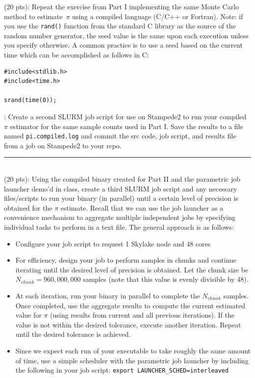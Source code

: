 \documentclass[letterpaper,12pt]{article}
\begin{document}
{ (20 pts): Repeat the exercise from Part I
implementing the same Monte Carlo method to estimate~$\pi$ using a
compiled language (C/C++ or Fortran). Note: if you use the
\texttt{rand()} function from the standard C library as the source of
the random number generator, the seed value is the same upon each
execution unless you specify otherwise. A common practice is to use a
seed based on the current time which can be accomplished as
follows in C:

\begin{verbatim}
#include<stdlib.h>
#include<time.h> 

srand(time(0));
\end{verbatim}

: Create a second SLURM job script for use on
Stampede2 to run your compiled $\pi$ estimator for the same sample
counts used in Part I. Save the results to a file named
\texttt{pi.compiled.log} and commit the src code, job script, and
results file from a job on Stampede2 to your repo. 

\clearpage
\noindent\rule{2cm}{0.4pt} \\

 (20 pts): Using the compiled binary created
for Part II and the parametric job launcher demo'd in class, create a
third SLURM job script and any necessary files/scripts to run your
binary (in parallel) until a certain level of precision is obtained
for the $\pi$ estimate.  Recall that we can use the job launcher as a
convenience mechanism to aggregate multiple independent jobs by
specifying individual tasks to perform in a text file. The general
approach is as follows:

\begin{itemize}

\item Configure your job script to request 1 Skylake node and 48 cores
\item For efficiency, design your job to perform samples in chunks and
  continue iterating until the desired level of precision is
  obtained. Let the chunk size be 
  $N_{chunk} = 960,000,000$ samples (note that this value is evenly divisible by 48).
\item At each iteration, run your binary in parallel to complete the
  $N_{chunk}$ samples. Once completed, use the aggregate results to
  compute the current estimated value for $\pi$ (using results from
  current and all previous iterations). If the value is not within the
  desired tolerance, execute another iteration. Repeat until the
  desired tolerance is achieved.
\item Since we expect each run of your executable to take roughly the
  same amount of time, use a simple scheduler with the parametric job
  launcher by including the following in
  your job script:
 \texttt{export LAUNCHER\_SCHED=interleaved}


\end{itemize}}
\end{document}
